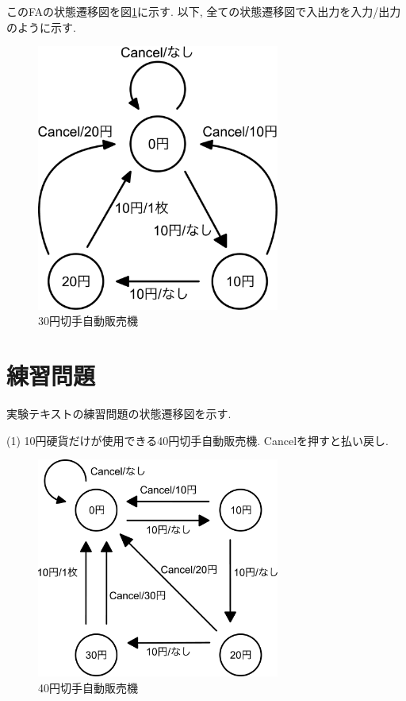 \documentclass[titlepage]{jsarticle}
\begin{document}
        このFAの状態遷移図を図\ref{fig:例状態遷移図}に示す.
        以下, 全ての状態遷移図で入出力を入力/出力のように示す.

        \begin{figure}[ht]
            \centering
            \includegraphics[width=8cm]{images/rei.pdf}
            \caption{30円切手自動販売機}
            \label{fig:例状態遷移図}
        \end{figure}

\section{練習問題}
    実験テキストの練習問題の状態遷移図を示す.

    (1) 10円硬貨だけが使用できる40円切手自動販売機. Cancelを押すと払い戻し.

    \begin{figure}[ht]
        \centering
        \includegraphics[width=8cm]{images/40.pdf}
        \caption{40円切手自動販売機}
        \label{fig:40状態遷移図}
    \end{figure}
\end{document}
